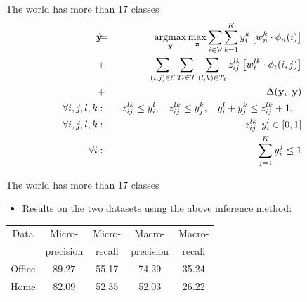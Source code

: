 \documentclass{beamer}
\DeclareMathOperator*{\argmax}{argmax}
\newcommand{\y}{{\mathbf y}}     %
\newcommand{\ysc}[2]{{y_{#1}^{#2}}}    %
\newcommand{\zsc}[2]{{z_{#1}^{#2}}}    %
\newcommand{\fn}[1]{{\phi_n(#1)}}      %
\newcommand{\fe}[3]{{\phi_{#1}(#2,#3)}}%
\newcommand{\wn}[1]{{w_n^{#1}}}        %
\newcommand{\we}[3]{{w_{#1}^{#2#3}}}   %
\newcommand{\loss}[2]{{\Delta(#1,#2)}}   %
\begin{document}
\begin{frame}{The world has more than 17 classes}
 \begin{eqnarray*}
\hat{\y}\!\!\!&=&\!\!\!\argmax_{\y}\max_{\mathbf z} \sum_{i \in \mathcal{V}} \sum_{k=1}^{K} \ysc{i}{k} \left[\wn{k} \cdot \fn{i} \right] \\
&+&  \!\!\!\sum_{(i,j)\in \mathcal{E}}  \sum_{T_t \in {\cal T}} \sum_{(l,k)\in T_t} \zsc{ij}{lk} \left[\we{t}{l}{k} \cdot \fe{t}{i}{j}\right] \\
&+& \loss{\y_i}{\y} \label{eq:relaxobj}\\
\forall i,j,l,k &:& \:\: \zsc{ij}{lk}\le \ysc{i}{l}, \:\:\:\:
\zsc{ij}{lk}\le \ysc{j}{k},\:\:\:\:
\ysc{i}{l} + \ysc{j}{k} \le \zsc{ij}{lk}+1,\:\:\:\: \\
\forall i,j,l,k &:& \zsc{ij}{lk},\ysc{i}{l} \in [ 0,1 ] \label{eq:relaxconst} \\
\forall i &:& \sum_{j=1}^{K} y_i^j \le 1
\end{eqnarray*} 
\end{frame}


\begin{frame}{The world has more than 17 classes}
\begin{itemize}
\item Results on the two datasets using the above inference method:
\end{itemize}

\begin{center}
\begin{tabular}{c | c | c | c | c}
Data & Micro-  & Micro-  & Macro-  & Macro-\\
 &  precision &  recall &  precision &  recall\\
\hline
Office & 89.27 & 55.17 & 74.29 & 35.24 \\
Home & 82.09 & 52.35 & 52.03 & 26.22 \\
\hline
\end{tabular}
\end{center}
\end{frame}
\end{document}
